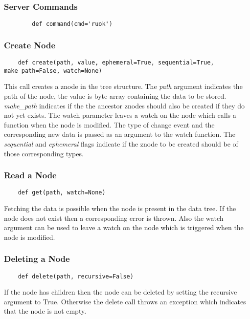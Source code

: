   \subsubsection{Server Commands}
  	\begin{lstlisting}
  		def command(cmd='ruok')
  	\end{lstlisting}


  \subsubsection{Create Node}
  \begin{lstlisting}
    def create(path, value, ephemeral=True, sequential=True, make_path=False, watch=None)
  \end{lstlisting}
  This call creates a znode in the tree structure. The \textit{path} argument indicates the path of the node, the value is byte array containing the data to be stored. \textit{make\_path} indicates if the the ancestor znodes should also be created if they do not yet exists. The watch parameter leaves a watch on the node which calls a function when the node is modified. The type of change event and the corresponding new data is passed as an argument to the watch function. The \textit{sequential} and \textit{ephemeral} flags indicate if the znode to be created should be of those corresponding types.
  
  \subsubsection{Read a Node}
  \begin{lstlisting}
    def get(path, watch=None)
  \end{lstlisting}
  Fetching the data is possible when the node is present in the data tree. If the node does not exist then a corresponding error is thrown. Also the watch argument can be used to leave a watch on the node which is triggered when the node is modified.
  
  \subsubsection{Deleting a Node}
  \begin{lstlisting}
    def delete(path, recursive=False)
  \end{lstlisting}
  If the node has children then the node can be deleted by setting the recursive argument to True. Otherwise the delete call throws an exception which indicates that the node is not empty.
  
